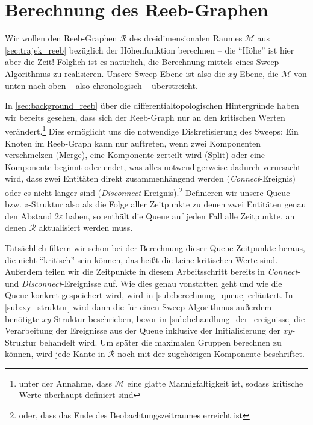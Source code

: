 \section{Berechnung des Reeb-Graphen} %
\label{sec:berechnung_reeb}
Wir wollen den Reeb-Graphen $\mathcal{R}$ des dreidimensionalen Raumes $\mathcal{M}$ aus \cref{sec:trajek_reeb} bezüglich der Höhenfunktion berechnen -- die \enquote{Höhe} ist hier aber die Zeit!
Folglich ist es natürlich, die Berechnung mittels eines Sweep-Algorithmus zu realisieren.
Unsere Sweep-Ebene ist also die $xy$-Ebene, die $\mathcal{M}$ von unten nach oben -- also chronologisch -- überstreicht.

In \cref{sec:background_reeb} über die differentialtopologischen Hintergründe haben wir bereits gesehen, dass sich der Reeb-Graph nur an den kritischen Werten verändert.\footnote{unter der Annahme, dass $\mathcal{M}$ eine glatte Mannigfaltigkeit ist, sodass kritische Werte überhaupt definiert sind}
Dies ermöglicht uns die notwendige Diskretisierung des Sweeps: Ein Knoten im Reeb-Graph kann nur auftreten, wenn zwei Komponenten verschmelzen (Merge), eine Komponente zerteilt wird (Split) oder eine Komponente beginnt oder endet, was alles notwendigerweise dadurch verursacht wird, dass zwei Entitäten direkt zusammenhängend werden (\emph{Connect}-Ereignis) oder es nicht länger sind (\emph{Disconnect}-Ereignis).\footnote{oder, dass das Ende des Beobachtungszeitraumes erreicht ist}
Definieren wir unsere Queue bzw. $z$-Struktur also als die Folge aller Zeitpunkte zu denen zwei Entitäten genau den Abstand $2 \varepsilon$ haben, so enthält die Queue auf jeden Fall alle Zeitpunkte, an denen $\mathcal{R}$ aktualisiert werden muss.

Tatsächlich filtern wir schon bei der Berechnung dieser Queue Zeitpunkte heraus, die nicht \enquote{kritisch} sein können, das heißt die keine kritischen Werte sind.
Außerdem teilen wir die Zeitpunkte in diesem Arbeitsschritt bereits in \emph{Connect}- und \emph{Disconnect}-Ereignisse auf.
Wie dies genau vonstatten geht und wie die Queue konkret gespeichert wird, wird in \cref{sub:berechnung_queue} erläutert.
In \cref{sub:xy_struktur} wird dann die für einen Sweep-Algorithmus außerdem benötigte $xy$-Struktur beschrieben, bevor in \cref{sub:behandlung_der_ereignisse} die Verarbeitung der Ereignisse aus der Queue inklusive der Initialisierung der $xy$-Struktur behandelt wird.
Um später die maximalen Gruppen berechnen zu können, wird jede Kante in $\mathcal{R}$ noch mit der zugehörigen Komponente beschriftet.

